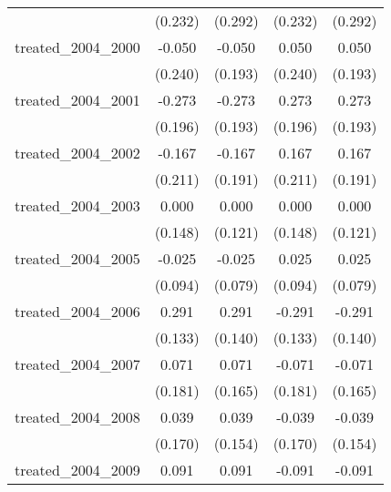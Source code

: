 {\begin{tabular}{l*{4}{c}}
            &     (0.232)         &     (0.292)         &     (0.232)         &     (0.292)         \\
[1em]
treated\_2004\_2000&      -0.050         &      -0.050         &       0.050         &       0.050         \\
            &     (0.240)         &     (0.193)         &     (0.240)         &     (0.193)         \\
[1em]
treated\_2004\_2001&      -0.273         &      -0.273         &       0.273         &       0.273         \\
            &     (0.196)         &     (0.193)         &     (0.196)         &     (0.193)         \\
[1em]
treated\_2004\_2002&      -0.167         &      -0.167         &       0.167         &       0.167         \\
            &     (0.211)         &     (0.191)         &     (0.211)         &     (0.191)         \\
[1em]
treated\_2004\_2003&       0.000         &       0.000         &       0.000         &       0.000         \\
            &     (0.148)         &     (0.121)         &     (0.148)         &     (0.121)         \\
[1em]
treated\_2004\_2005&      -0.025         &      -0.025         &       0.025         &       0.025         \\
            &     (0.094)         &     (0.079)         &     (0.094)         &     (0.079)         \\
[1em]
treated\_2004\_2006&       0.291\sym{*}  &       0.291\sym{*}  &      -0.291\sym{*}  &      -0.291\sym{*}  \\
            &     (0.133)         &     (0.140)         &     (0.133)         &     (0.140)         \\
[1em]
treated\_2004\_2007&       0.071         &       0.071         &      -0.071         &      -0.071         \\
            &     (0.181)         &     (0.165)         &     (0.181)         &     (0.165)         \\
[1em]
treated\_2004\_2008&       0.039         &       0.039         &      -0.039         &      -0.039         \\
            &     (0.170)         &     (0.154)         &     (0.170)         &     (0.154)         \\
[1em]
treated\_2004\_2009&       0.091         &       0.091         &      -0.091         &      -0.091         \\

\end{tabular}}
